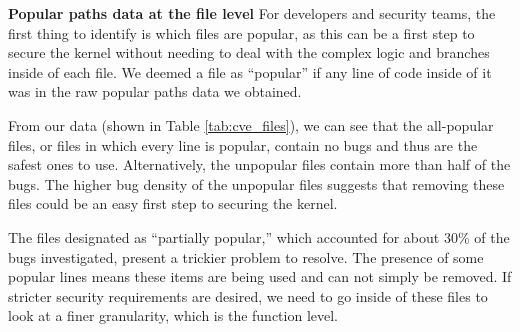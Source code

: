 \noindent
\textbf{Popular paths data at the file level}
\newline
For developers and security teams, the first thing to identify is which files are popular, 
as this can be a first step to secure the kernel without needing to deal with the complex logic and branches inside of each file. 
We deemed a file as ``popular'' if any line of code inside of it was in the raw popular paths data we obtained. 

From our data (shown in Table \ref{tab:cve_files}), we can see that the all-popular files, or files in which every line is popular, contain no bugs  and thus are the safest ones to use. 
Alternatively, the unpopular files contain more than half of the bugs. 
The higher bug density of the unpopular files suggests that removing these files could be an easy first step to securing the kernel. 

The files designated as ``partially popular,'' which accounted for about 30\% of the bugs investigated, present a trickier problem to resolve. 
The presence of some popular lines means these items are being used and can not simply be removed. If stricter security requirements are desired, 
we need to go inside of these files to look at a finer granularity, which is the function level. 

